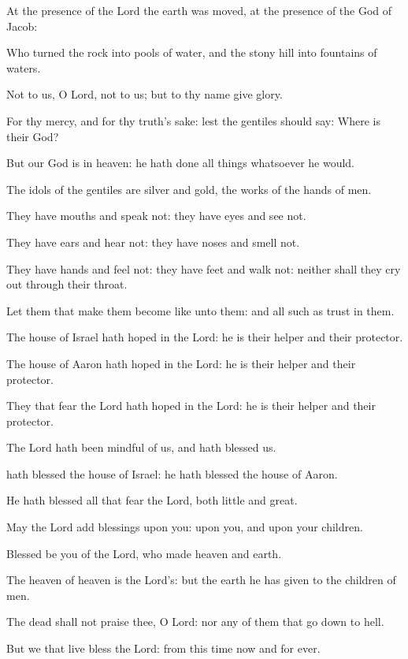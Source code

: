 \documentclass[letterpaper,12pt]{article} %
\begin{document}
\begin{parcolumns}[rulebetween,colwidths={1=267pt}]{2}
{\begin{psalmverses}[0]
\item At the presence of the Lord the earth was moved, at the presence of the God of Jacob:
\item Who turned the rock into pools of water, and the stony hill into fountains of waters.
\item Not to us, O Lord, not to us; but to thy name give glory.
\item For thy mercy, and for thy truth's sake: lest the gentiles should say: Where is their God?
\item But our God is in heaven: he hath done all things whatsoever he would.
\item The idols of the gentiles are silver and gold, the works of the hands of men.
\item They have mouths and speak not: they have eyes and see not.
\item They have ears and hear not: they have noses and smell not.
\item They have hands and feel not: they have feet and walk not: neither shall they cry out through their throat.
\item Let them that make them become like unto them: and all such as trust in them.
\item The house of Israel hath hoped in the Lord: he is their helper and their protector.
\item The house of Aaron hath hoped in the Lord: he is their helper and their protector.
\item They that fear the Lord hath hoped in the Lord: he is their helper and their protector.
\item The Lord hath been mindful of us, and hath blessed us.
\item hath blessed the house of Israel: he hath blessed the house of Aaron.
\item He hath blessed all that fear the Lord, both little and great.
\item May the Lord add blessings upon you: upon you, and upon your children.
\item Blessed be you of the Lord, who made heaven and earth.
\item The heaven of heaven is the Lord's: but the earth he has given to the children of men.
\item The dead shall not praise thee, O Lord: nor any of them that go down to hell.
\item But we that live bless the Lord: from this time now and for ever.
\end{psalmverses}}
\end{parcolumns}
\end{document}
